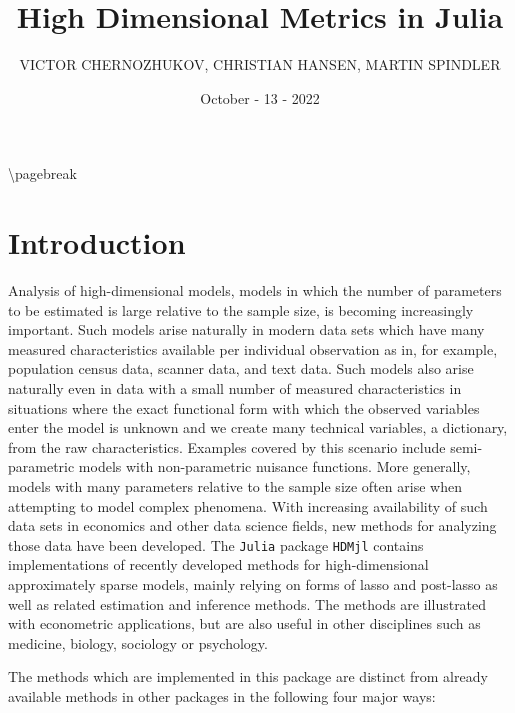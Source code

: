 \documentclass[12pt,a4paper]{article}
\title{ High Dimensional Metrics in Julia }
\author{ VICTOR CHERNOZHUKOV, CHRISTIAN HANSEN, MARTIN SPINDLER }
\date{ October - 13 - 2022 }
\begin{document}
\maketitle

{\textbackslash}pagebreak 

\section{Introduction}
Analysis of high-dimensional models, models in which the number of parameters to be estimated is large relative to the sample size, is becoming increasingly important. Such models arise naturally in modern data sets which have many measured characteristics available per individual observation as in, for example, population census data, scanner data, and text data. Such models also arise naturally even in data with a small number of measured characteristics in situations where the exact functional form with which the observed variables enter the model is unknown and we create many technical variables, a dictionary, from the raw characteristics. Examples covered by this scenario include semi-parametric models with non-parametric nuisance functions. More generally, models with many parameters relative to the sample size often arise when attempting to model complex phenomena. With increasing availability of such data sets in economics and other data science fields, new methods for analyzing those data have been developed. The \texttt{Julia} package \texttt{HDMjl} contains implementations of recently developed methods for high-dimensional approximately sparse models, mainly relying on forms of lasso and post-lasso as well as related estimation and inference methods. The methods are illustrated with econometric applications, but are also useful in other disciplines such as medicine, biology, sociology or psychology.

The methods which are implemented in this package are distinct from already available methods in other packages in the following four major ways:
\end{document}
